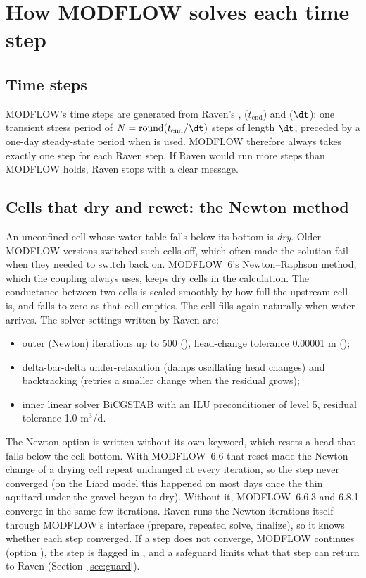\section{How MODFLOW solves each time step}\label{ch:mf6}
\subsection{Time steps}
MODFLOW's time steps are generated from Raven's ,  ($t_{\mathrm{end}}$) and  ($\dt$): one transient
stress period of $N=\mathrm{round}(t_{\mathrm{end}}/\dt)$ steps of length $\dt$, preceded by a one-day steady-state period when
 is used. MODFLOW therefore always takes exactly one step for each Raven step.
If Raven would run more steps than MODFLOW holds, Raven stops with a clear message.

\subsection{Cells that dry and rewet: the Newton method}
An unconfined cell whose water table falls below its bottom is \emph{dry}. Older MODFLOW versions switched such cells
off, which often made the solution fail when they needed to switch back on. MODFLOW~6's Newton--Raphson method, which the coupling always uses, keeps dry cells in the calculation. The conductance
between two cells is scaled smoothly by how full the upstream cell is, and falls to zero as that cell empties. The cell
fills again naturally when water arrives. The solver settings written by Raven are:
\begin{itemize}
\item outer (Newton) iterations up to 500 (), head-change tolerance 0.00001 m ();
\item delta-bar-delta under-relaxation (damps oscillating head changes) and backtracking (retries a smaller change
when the residual grows);
\item inner linear solver BiCGSTAB with an ILU preconditioner of level 5, residual tolerance 1.0 m$^3$/d.
\end{itemize}
The Newton option is written without its own  keyword, which resets a head that falls below the cell
bottom. With MODFLOW~6.6 that reset made the Newton change of a drying cell repeat unchanged at every iteration, so the
step never converged (on the Liard model this happened on most days once the thin aquitard under the gravel began to dry).
Without it, MODFLOW~6.6.3 and 6.8.1 converge in the same few iterations.
Raven runs the Newton iterations itself through MODFLOW's interface (prepare, repeated solve, finalize), so it knows
whether each step converged. If a step does not converge, MODFLOW continues (option ), the step is
flagged in , and a safeguard limits what that step can return to Raven (Section~\ref{sec:guard}).

